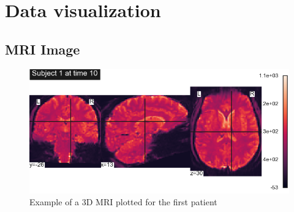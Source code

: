 
\section{Data visualization}

\subsection{MRI Image}
\begin{figure}
    \centering
    \includegraphics[width=\textwidth]{img/example_fmri.png}
    \caption{Example of a 3D MRI plotted for the first patient}
    \label{fig:ex_mri}
\end{figure}

